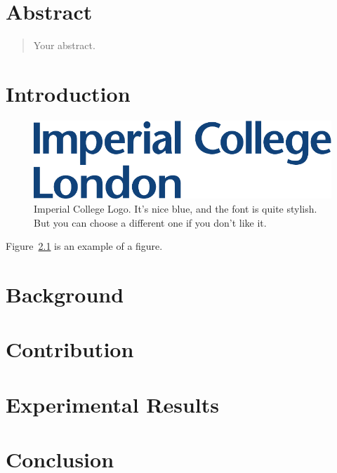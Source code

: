 \documentclass[12pt,twoside]{report}
\begin{document}



\clearpage{\pagestyle{empty}\cleardoublepage}
\setcounter{page}{1}
\pagestyle{fancy}



\tableofcontents 


\clearpage{\pagestyle{empty}\cleardoublepage}
\setcounter{page}{1}
\fancyhead[LE,RO]{\slshape \rightmark}
\fancyhead[LO,RE]{\slshape \leftmark}

\chapter{Abstract}
\begin{abstract}
    Your abstract.
\end{abstract}

\chapter{Introduction}

\begin{figure}[tb]
\centering
\includegraphics[width = 0.4\hsize]{./figures/imperial}
\caption{Imperial College Logo. It's nice blue, and the font is quite stylish. But you can choose a different one if you don't like it.} \label{fig:logo}
\end{figure}

Figure~\ref{fig:logo} is an example of a figure. 

\chapter{Background}



\chapter{Contribution}


\chapter{Experimental Results}


\chapter{Conclusion}


% 

\printbibliography
\end{document}
